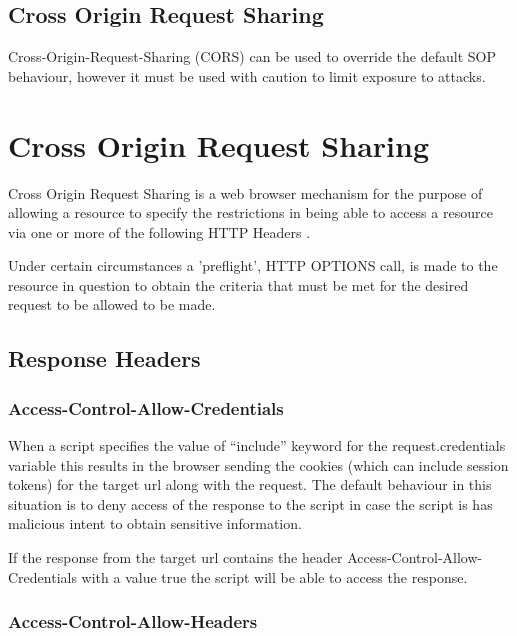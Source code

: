 \documentclass{mscreport}
\begin{document}
\subsection{Cross Origin Request Sharing}
\label{section:Cross-Origin-Request-Sharing}
Cross-Origin-Request-Sharing (CORS) can be used to override the default SOP behaviour, however it must be used with caution to limit exposure to attacks.


\newpage

\section{Cross Origin Request Sharing}
\label{section:cors}

Cross Origin Request Sharing is a web browser mechanism for the purpose of allowing a resource to specify the restrictions in being able to access a resource via one or more of the following HTTP Headers \cite{Apple2006-hk}.

\vspace{0.3cm}
\noindent
Under certain circumstances a 'preflight', HTTP OPTIONS call, is made to the resource in question to obtain the criteria that must be met for the desired request to be allowed to be made.

\subsection{Response Headers}

\subsubsection{Access-Control-Allow-Credentials}

When a script specifies the value of “include” keyword for the request.credentials variable this results in the browser sending the cookies (which can include session tokens) for the target url along with the request. The default behaviour in this situation is to deny access of the response to the script in case the script is has malicious intent to obtain sensitive information.

\vspace{0.3cm}
\noindent
If the response from the target url contains the header Access-Control-Allow-Credentials with a value true the script will be able to access the response.

\subsubsection{Access-Control-Allow-Headers}
\end{document}
